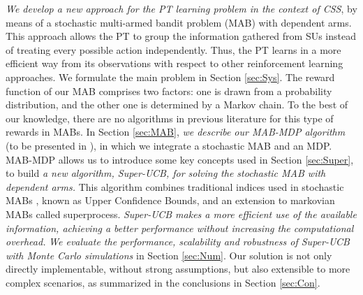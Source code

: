\textit{We develop a new approach for the PT learning problem in the context of CSS}, by means of a stochastic multi-armed bandit problem (MAB) with dependent arms. This approach allows the PT to group the information gathered from SUs instead of treating every possible action independently. Thus, the PT learns in a more efficient way from its observations with respect to other reinforcement learning approaches. We formulate the main problem in Section \ref{sec:Sys}.
The reward function of our MAB comprises two factors: one is drawn from a probability distribution, and the other one is determined by a Markov chain.
To the best of our knowledge, there are no algorithms in previous literature for this type of rewards in MABs. 
In Section \ref{sec:MAB}, \textit{we describe our MAB-MDP algorithm} (to be presented in \cite{ref:Mario2015}), in which we integrate a stochastic MAB and an MDP. MAB-MDP allows us to introduce some key concepts used in Section \ref{sec:Super}, to build \textit{a new algorithm, Super-UCB, for solving the stochastic MAB with dependent arms.} This algorithm combines traditional indices used in stochastic MABs \cite{ref:Auer2002}, known as Upper Confidence Bounds, and an extension to markovian MABs \cite{ref:Gittins2011} called superprocess. \textit{Super-UCB makes a more efficient use of the available information, achieving a better performance without increasing the computational overhead.} \textit{We evaluate the performance, scalability and robustness of Super-UCB with Monte Carlo simulations} in Section \ref{sec:Num}.
Our solution is not only directly implementable, without strong assumptions, but also extensible to more complex scenarios, as summarized in the conclusions in Section \ref{sec:Con}.


